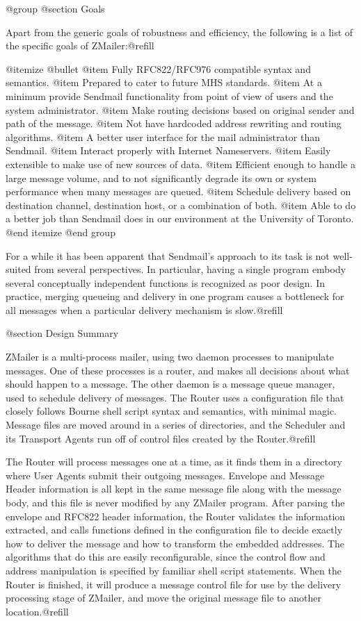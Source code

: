 @group
@section Goals

Apart from the generic goals of robustness and efficiency, the
following is a list of the specific goals of ZMailer:@refill

@itemize @bullet
@item
Fully RFC822/RFC976 compatible syntax and semantics.
@item
Prepared to cater to future MHS standards.
@item
At a minimum provide Sendmail functionality from point of view of
users and the system administrator.
@item
Make routing decisions based on original sender and path of the message.
@item
Not have hardcoded address rewriting and routing algorithms.
@item
A better user interface for the mail administrator than Sendmail.
@item
Interact properly with Internet Nameservers.
@item
Easily extensible to make use of new sources of data.
@item
Efficient enough to handle a large message volume, and to not significantly
degrade its own or system performance when many messages are queued.
@item
Schedule delivery based on destination channel, destination host, or a
combination of both.
@item
Able to do a better job than Sendmail does in our environment at the
University of Toronto.
@end itemize
@end group

For a while it has been apparent that Sendmail's approach to its
task is not well-suited from several perspectives. In particular, having a
single program embody several conceptually independent functions is recognized
as poor design. In practice, merging queueing and delivery in one program
causes a bottleneck for all messages when a particular delivery mechanism
is slow.@refill

@section Design Summary

ZMailer is a multi-process mailer, using two daemon processes to manipulate
messages.  One of these processes is a router, and makes all decisions about
what should happen to a message.  The other daemon is a message queue manager,
used to schedule delivery of messages.  The Router uses a configuration file
that closely follows Bourne shell script syntax and semantics, with minimal
magic.  Message files are moved around in a series of directories, and the
Scheduler and its Transport Agents run off of control files created by the
Router.@refill

The Router will process messages one at a time, as it finds them
in a directory where User Agents submit their outgoing messages.  Envelope
and Message Header information is all kept in the same message file along
with the message body, and this file is never modified by any ZMailer
program.  After parsing the envelope and RFC822 header information, the
Router validates the information extracted, and calls functions defined in
the configuration file to decide exactly how to deliver the message and how
to transform the embedded addresses.  The algorithms that do this are easily
reconfigurable, since the control flow and address manipulation is specified
by familiar shell script statements.  When the Router is finished, it will
produce a message control file for use by the delivery processing stage of
ZMailer, and move the original message file to another location.@refill

